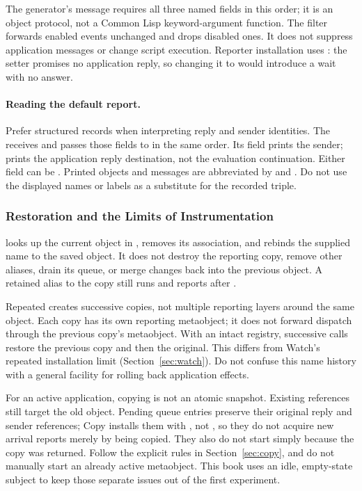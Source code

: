 The generator's message requires all three named fields in this order;
it is an object protocol, not a Common Lisp keyword-argument function.
The filter forwards enabled events unchanged and drops disabled ones.
It does not suppress application messages or change script execution.
Reporter installation uses \code{<=}: the setter promises no application
reply, so changing it to \code{<==} would introduce a wait with no answer.

\paragraph{Reading the default report.}
Prefer structured records when interpreting reply and sender identities.
The  receives \code{[M R S]} and passes those
fields to  in the same order.
Its  field prints the sender;  prints the
application reply destination, not the evaluation continuation.
Either field can be . Printed objects and messages are abbreviated by
 and . Do not use the displayed
names or labels as a substitute for the recorded triple.

\subsubsection{Restoration and the Limits of Instrumentation}

 looks up the current object in ,
removes its association, and rebinds the supplied name to the saved object.
It does not destroy the reporting copy, remove other aliases, drain its
queue, or merge changes back into the previous object. A retained alias
to the copy still runs and reports after .

Repeated  creates successive copies, not multiple reporting
layers around the same object. Each copy has its own reporting metaobject;
it does not forward dispatch through the previous copy's metaobject.
With an intact registry, successive  calls restore the
previous copy and then the original. This differs from Watch's repeated
installation limit (Section~\ref{sec:watch}). Do not confuse this name
history with a general facility for rolling back application effects.

For an active application, copying is not an atomic snapshot. Existing
references still target the old object. Pending queue entries preserve
their original reply and sender references; Copy installs them with
, not , so they do not acquire new arrival
reports merely by being copied. They also do not start simply because
the copy was returned. Follow the explicit  rules in
Section~\ref{sec:copy}, and do not manually start an already active
metaobject. This book uses an idle, empty-state subject to keep those
separate issues out of the first experiment.

